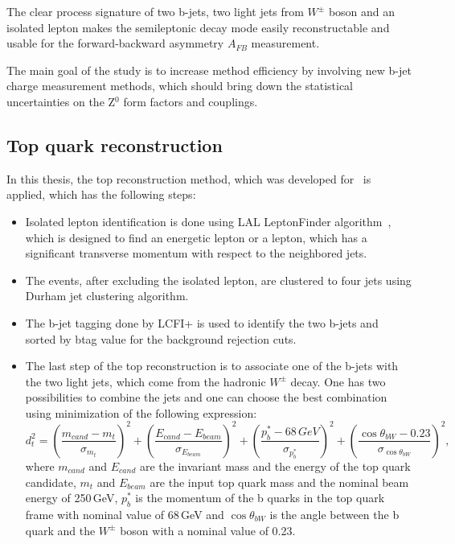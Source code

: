 The clear process signature of two b-jets, two light jets from $W^\pm$ boson and an isolated lepton makes the semileptonic decay mode easily reconstructable and usable for the forward-backward asymmetry $A_{FB}$ measurement. 

The main goal of the study is to increase method efficiency by involving new b-jet charge measurement methods, which should bring down the statistical uncertainties on the \ttbar Z$^0$ form factors and couplings.  


\subsection{Top quark reconstruction}
In this thesis, the top reconstruction method, which was developed for~\cite{bib:ILCTOP} is applied, which has the following steps:
\begin{itemize}
	\item Isolated lepton identification is done using LAL LeptonFinder algorithm~\cite{bib:Doublet}, which is designed to find an energetic lepton or a lepton, which has a significant transverse momentum with respect to the neighbored jets. 
	\item The events, after excluding the isolated lepton, are clustered to four jets using Durham jet clustering algorithm.
	\item The b-jet tagging done by LCFI+ is used to identify the two b-jets and sorted by btag value for the background rejection cuts. 
	\item The last step of the top reconstruction is to associate one of the b-jets with the two light jets, which come from the hadronic $W^\pm$ decay.  One has two possibilities to combine the jets and one can choose the best combination using minimization of the following expression:
	\begin{equation}
	\label{formula:Chi2Top_3}
	d^2_{t} = (\frac{m_{cand}-m_{t}}{\sigma_{m_t}})^2 + (\frac{E_{cand}-E_{beam}}{\sigma_{E_{beam}}})^2+(\frac{p^*_b-68\,GeV}{\sigma_{p^*_b}})^2 + (\frac{\cos\theta_{bW}-0.23}{\sigma_{\cos\theta_{bW}}})^2,
	\end{equation}
	where $m_{cand}$ and $E_{cand}$ are the invariant mass and the energy of the top quark candidate, $m_t$ and $E_{beam}$ are the input top quark mass and the nominal beam energy of 250\,GeV, $p^*_b$ is the momentum of the b quarks in the top quark frame with nominal value of 68\,GeV and $\cos\theta_{bW}$ is the angle between the b quark and the $W^\pm$ boson with a nominal value of 0.23.
\end{itemize}

